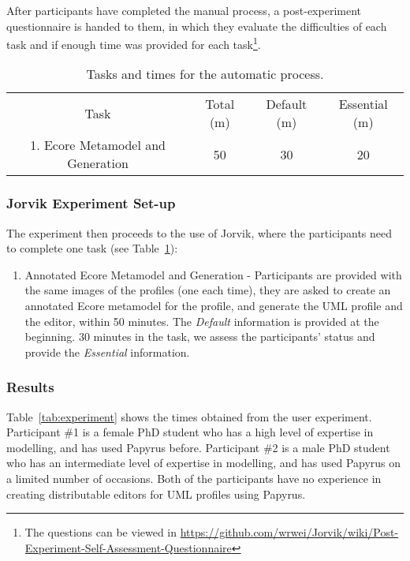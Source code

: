 After participants have completed the manual process, a post-experiment questionnaire is handed to them, in which they evaluate the difficulties of each task and if enough time was provided for each task\footnote{The questions can be viewed in \url{https://github.com/wrwei/Jorvik/wiki/Post-Experiment-Self-Assessment-Questionnaire}}.

\begin{table}[ht!]
	\centering
	\setlength{\tabcolsep}{3.5pt} 
	\begin{tabular}{|c|c|c|c|}
		Task & Total (m) & Default (m) & Essential (m) \\ 
		1. Ecore Metamodel and Generation & 50 & 30 & 20 \\
	\end{tabular}
	\caption{Tasks and times for the automatic process.}
	\label{tab:automatic}
\end{table}

\subsubsection{Jorvik Experiment Set-up}
The experiment then proceeds to the use of Jorvik, where the participants need to complete one task (see Table~\ref{tab:automatic}):
\begin{enumerate}
	\item Annotated Ecore Metamodel and Generation - Participants are provided with the same images of the profiles (one each time), they are asked to create an annotated Ecore metamodel for the profile, and generate the UML profile and the editor, within 50 minutes.
	The \textit{Default} information is provided at the beginning. 
	30 minutes in the task, we assess the participants' status and provide the \textit{Essential} information.
\end{enumerate}



\subsubsection{Results}
Table~\ref{tab:experiment} shows the times obtained from the user experiment.
Participant \#1 is a female PhD student who has a high level of expertise in modelling, and has used Papyrus before.
Participant \#2 is a male PhD student who has an intermediate level of expertise in modelling, and has used Papyrus on a limited number of occasions. 
Both of the participants have no experience in creating distributable editors for UML profiles using Papyrus.

